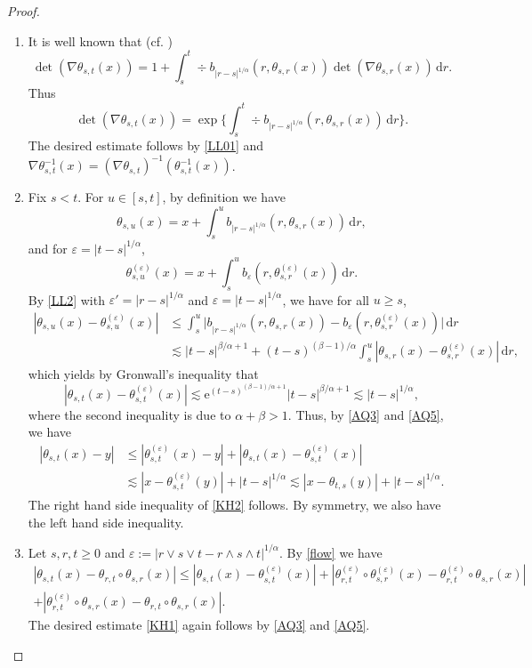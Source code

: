 \documentclass[11pt]{article}
\numberwithin{equation}{section}\providecommand{\asymp}{\mathrel{\sim}}
\theoremstyle{plain}
\theoremstyle{definition}
\newcommand\e{\mathrm{e}}
\let\eps\varepsilon
\newcommand\1{{\mathbf{1}}}
\newcommand{\dif}{\,\mathrm{d}}
\begin{document}
\begin{proof}
\begin{enumerate}
\item
It is well known that (cf. \cite[Prop.\,1.2]{MB02})
\[
\det(\nabla\theta_{s,t}(x))=1+\int^t_s\div b_{|r-s|^{1/\alpha}}(r,\theta_{s,r}(x))\det(\nabla\theta_{s,r}(x))\dif r.
\]
Thus
\[
\det(\nabla\theta_{s,t}(x))=\exp\biggl\{\int^t_s\div b_{|r-s|^{1/\alpha}}(r,\theta_{s,r}(x))\dif r\biggr\}.
\]
The desired estimate follows by \eqref{LL01} and $\nabla\theta^{-1}_{s,t}(x)=(\nabla\theta_{s,t})^{-1}(\theta^{-1}_{s,t}(x))$.

\item
Fix $s<t$. For $u\in[s,t]$, by definition we have
\[
\theta_{s,u}(x)=x+\int^u_sb_{|r-s|^{1/\alpha}}(r,\theta_{s,r}(x))\dif r,
\]
and for $\eps=|t-s|^{1/\alpha}$,
\[
\theta^{(\eps)}_{s,u}(x)=x+\int^u_sb_{\eps}(r,\theta^{(\eps)}_{s,r}(x))\dif r.
\]
By \eqref{LL2} with $\eps'=|r-s|^{1/\alpha}$ and $\eps=|t-s|^{1/\alpha}$, we have for all $u\ge s $,
\begin{align*}
|\theta_{s,u}(x)-\theta^{(\eps)}_{s,u}(x)|
&\le \int^u_s\Big|b_{|r-s|^{1/\alpha}}(r,\theta_{s,r}(x))-b_{\eps}(r,\theta^{(\eps)}_{s,r}(x))\Big|\dif r
\\&\lesssim |t-s|^{\beta/\alpha+1}+(t-s)^{(\beta-1)/\alpha}\int^u_s|\theta_{s,r}(x)-\theta^{(\eps)}_{s,r}(x)|\dif r,
\end{align*}
which yields by Gronwall's inequality that
\begin{equation}\label{AQ5}
|\theta_{s,t}(x)-\theta^{(\eps)}_{s,t}(x)|\lesssim\e^{(t-s)^{(\beta-1)/\alpha+1}} |t-s|^{\beta/\alpha+1}\lesssim |t-s|^{1/\alpha},
\end{equation}
where the second inequality is due to $\alpha+\beta>1$.
Thus, by \eqref{AQ3} and \eqref{AQ5}, we have
\begin{align*}
|\theta_{s,t}(x)-y|&\leq|\theta^{(\eps)}_{s,t}(x)-y|+|\theta_{s,t}(x)-\theta^{(\eps)}_{s,t}(x)|
\\&\lesssim |x-\theta^{(\eps)}_{s,t}(y)|+|t-s|^{1/\alpha}\lesssim |x-\theta_{t,s}(y)|+|t-s|^{1/\alpha}.
\end{align*}
The right hand side inequality of \eqref{KH2} follows. By symmetry, we also have the left hand side inequality.

\item
Let $s,r,t\geq 0$ and $\eps:=|r\vee s\vee t-r\wedge s\wedge t|^{1/\alpha}$. By \eqref{flow} we have
\begin{multline*}
|\theta_{s,t}(x)-\theta_{r,t}\circ\theta_{s,r}(x)|
\leq|\theta_{s,t}(x)-\theta^{(\eps)}_{s,t}(x)|
+|\theta^{(\eps)}_{r,t}\circ\theta^{(\eps)}_{s,r}(x)-\theta^{(\eps)}_{r,t}\circ\theta_{s,r}(x)|
\\+|\theta^{(\eps)}_{r,t}\circ\theta_{s,r}(x)-\theta_{r,t}\circ\theta_{s,r}(x)|.
\end{multline*}
The desired estimate \eqref{KH1} again follows by \eqref{AQ3} and \eqref{AQ5}.\qedhere
\end{enumerate}
\end{proof}
\end{document}
